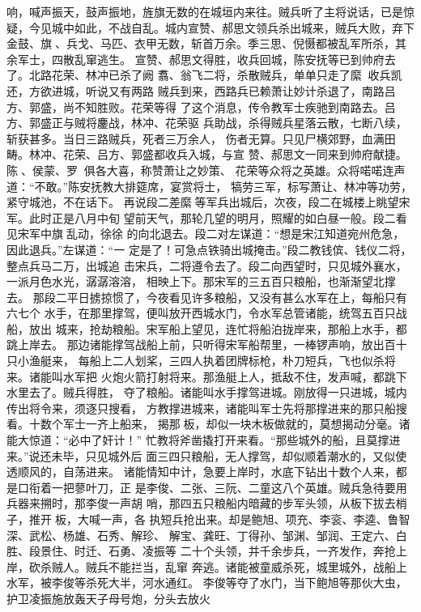 响，喊声振天，鼓声振地，旌旗无数的在城垣内来往。贼兵听了主将说话，已是惊
疑，今见城中如此，不战自乱。城内宣赞、郝思文领兵杀出城来，贼兵大败，弃下
金鼓、旗、兵戈、马匹、衣甲无数，斩首万余。季三思、倪慑都被乱军所杀，其
余军士，四散乱窜逃生。
宣赞、郝思文得胜，收兵回城，陈安抚等已到帅府去了。北路花荣、林冲已杀了阙
翥、翁飞二将，杀散贼兵，单单只走了縻，收兵凯还，方欲进城，听说又有两路
贼兵到来，西路兵已赖萧让妙计杀退了，南路吕方、郭盛，尚不知胜败。花荣等得
了这个消息，传令教军士疾驰到南路去。吕方、郭盛正与贼将鏖战，林冲、花荣驱
兵助战，杀得贼兵星落云散，七断八续，斩获甚多。当日三路贼兵，死者三万余人，
伤者无算。只见尸横郊野，血满田畴。林冲、花荣、吕方、郭盛都收兵入城，与宣
赞、郝思文一同来到帅府献捷。陈、侯蒙、罗，俱各大喜，称赞萧让之妙策、
花荣等众将之英雄。众将喏喏连声道：“不敢。”陈安抚教大排筵席，宴赏将士，
犒劳三军，标写萧让、林冲等功劳，紧守城池，不在话下。
再说段二差縻等军兵出城后，次夜，段二在城楼上眺望宋军。此时正是八月中旬
望前天气，那轮几望的明月，照耀的如白昼一般。段二看见宋军中旗乱动，徐徐
的向北退去。段二对左谋道：“想是宋江知道宛州危急，因此退兵。”左谋道：“一
定是了！可急点铁骑出城掩击。”段二教钱傧、钱仪二将，整点兵马二万，出城追
击宋兵，二将遵令去了。段二向西望时，只见城外襄水，一派月色水光，潺潺溶溶，
相映上下。那宋军的三五百只粮船，也渐渐望北撑去。
那段二平日掳掠惯了，今夜看见许多粮船，又没有甚么水军在上，每船只有六七个
水手，在那里撑驾，便叫放开西城水门，令水军总管诸能，统驾五百只战船，放出
城来，抢劫粮船。宋军船上望见，连忙将船泊拢岸来，那船上水手，都跳上岸去。
那边诸能撑驾战船上前，只听得宋军船帮里，一棒锣声响，放出百十只小渔艇来，
每船上二人划桨，三四人执着团牌标枪，朴刀短兵，飞也似杀将来。诸能叫水军把
火炮火箭打射将来。那渔艇上人，抵敌不住，发声喊，都跳下水里去了。贼兵得胜，
夺了粮船。诸能叫水手撑驾进城。刚放得一只进城，城内传出将令来，须逐只搜看，
方教撑进城来，诸能叫军士先将那撑进来的那只船搜看。十数个军士一齐上船来，
揭那板，却似一块木板做就的，莫想揭动分毫。诸能大惊道：“必中了奸计！”
忙教将斧凿撬打开来看。“那些城外的船，且莫撑进来。”说还未毕，只见城外后
面三四只粮船，无人撑驾，却似顺着潮水的，又似使透顺风的，自荡进来。
诸能情知中计，急要上岸时，水底下钻出十数个人来，都是口衔着一把蓼叶刀，正
是李俊、二张、三阮、二童这八个英雄。贼兵急待要用兵器来搠时，那李俊一声胡
哨，那四五只粮船内暗藏的步军头领，从板下拔去梢子，推开板，大喊一声，各
执短兵抢出来。却是鲍旭、项充、李衮、李逵、鲁智深、武松、杨雄、石秀、解珍、
解宝、龚旺、丁得孙、邹渊、邹润、王定六、白胜、段景住、时迁、石勇、凌振等
二十个头领，并千余步兵，一齐发作，奔抢上岸，砍杀贼人。贼兵不能拦当，乱窜
奔逃。诸能被童威杀死，城里城外，战船上水军，被李俊等杀死大半，河水通红。
李俊等夺了水门，当下鲍旭等那伙大虫，护卫凌振施放轰天子母号炮，分头去放火
